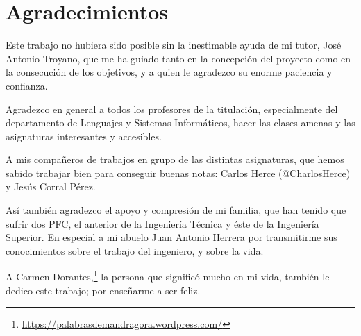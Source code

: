 
\thispagestyle{plain}
\section*{Agradecimientos}

Este trabajo no hubiera sido posible sin la inestimable ayuda de mi tutor, José Antonio Troyano, que me ha guiado tanto en la concepción del proyecto como en la consecución de los objetivos, y a quien le agradezco su enorme paciencia y confianza.

Agradezco en general a todos los profesores de la titulación, especialmente del departamento de Lenguajes y Sistemas Informáticos, hacer las clases amenas y las asignaturas interesantes y accesibles.

A mis compañeros de trabajos en grupo de las distintas asignaturas, que hemos sabido trabajar bien para conseguir buenas notas: Carlos Herce (\href{https://twitter.com/charlosherce}{@CharlosHerce}) y Jesús Corral Pérez.

Así también agradezco el apoyo y compresión de mi familia, que han tenido que sufrir dos PFC, el anterior de la Ingeniería Técnica y éste de la Ingeniería Superior. En especial a mi abuelo Juan Antonio Herrera por transmitirme sus conocimientos sobre el trabajo del ingeniero, y sobre la vida.

A Carmen Dorantes,\footnote{\url{https://palabrasdemandragora.wordpress.com/}} la persona que significó mucho en mi vida, también le dedico este trabajo; por enseñarme a ser feliz.
